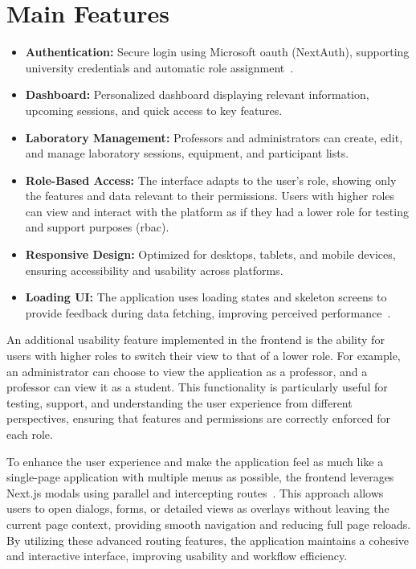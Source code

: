 \section{Main Features}
\begin{itemize}
    \item \textbf{Authentication:} Secure login using Microsoft \ac{oauth} (NextAuth), supporting university credentials and automatic role assignment~\cite{nextjs-authentication}.
    \item \textbf{Dashboard:} Personalized dashboard displaying relevant information, upcoming sessions, and quick access to key features.
    \item \textbf{Laboratory Management:} Professors and administrators can create, edit, and manage laboratory sessions, equipment, and participant lists.
    \item \textbf{Role-Based Access:} The interface adapts to the user's role, showing only the features and data relevant to their permissions. Users with higher roles can view and interact with the platform as if they had a lower role for testing and support purposes (\ac{rbac}).
    \item \textbf{Responsive Design:} Optimized for desktops, tablets, and mobile devices, ensuring accessibility and usability across platforms.
    \item \textbf{Loading UI:} The application uses loading states and skeleton screens to provide feedback during data fetching, improving perceived performance~\cite{nextjs-loading-ui}.
\end{itemize}

An additional usability feature implemented in the frontend is the ability for users with higher roles to switch their view to that of a lower role. For example, an administrator can choose to view the application as a professor, and a professor can view it as a student. This functionality is particularly useful for testing, support, and understanding the user experience from different perspectives, ensuring that features and permissions are correctly enforced for each role.

To enhance the user experience and make the application feel as much like a single-page application with multiple menus as possible, the frontend leverages Next.js modals using parallel and intercepting routes~\cite{nextjs-app-router}. This approach allows users to open dialogs, forms, or detailed views as overlays without leaving the current page context, providing smooth navigation and reducing full page reloads. By utilizing these advanced routing features, the application maintains a cohesive and interactive interface, improving usability and workflow efficiency.

